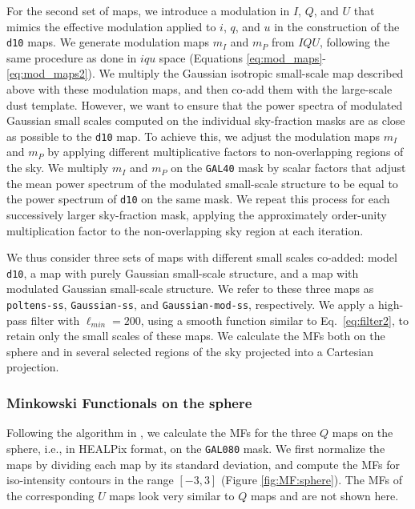 \documentclass[twocolumn]{aastex631}
\begin{document}
For the second set of maps, we introduce a modulation in $I$, $Q$, and $U$ that mimics the effective modulation applied to $i$, $q$, and $u$ in the construction of the \texttt{d10} maps. We generate modulation maps $m_I$ and $m_P$ from $IQU$, following the same procedure as done in $iqu$ space (Equations \ref{eq:mod_maps}-\ref{eq:mod_maps2}). We multiply the Gaussian isotropic small-scale map described above with these modulation maps, and then co-add them with the large-scale dust template. However, we want to ensure that the power spectra of modulated Gaussian small scales computed on the individual sky-fraction masks are as close as possible to the \texttt{d10} map. To achieve this, we adjust the modulation maps $m_I$ and $m_P$ by applying different multiplicative factors to non-overlapping regions of the sky. We multiply $m_I$ and $m_P$ on the \texttt{GAL40} mask by scalar factors that adjust the mean power spectrum of the modulated small-scale structure to be equal to the power spectrum of \texttt{d10} on the same mask. We repeat this process for each successively larger sky-fraction mask, applying the approximately order-unity multiplication factor to the non-overlapping sky region at each iteration. 

We thus consider three sets of maps with different small scales co-added: model \texttt{d10}, a map with purely Gaussian small-scale structure, and a map with modulated Gaussian small-scale structure. We refer to these three maps as \texttt{poltens-ss}, \texttt{Gaussian-ss}, and \texttt{Gaussian-mod-ss}, respectively. 
We apply a high-pass filter with $\ell_{min} = 200$, using a smooth function similar to Eq.~\ref{eq:filter2}, to retain only the small scales of these maps. We calculate the MFs both on the sphere and in several selected regions of the sky projected into a Cartesian projection. 

\subsubsection{Minkowski Functionals on the sphere}

Following the algorithm in \cite{Grewal:2022}, we calculate the MFs for the three $Q$ maps on the sphere, i.e., in HEALPix format, on the \texttt{GAL080} mask. We first normalize the maps by dividing each map by its standard deviation, and compute the MFs for iso-intensity contours in the range $[-3, 3]$ (Figure \ref{fig:MF:sphere}). The MFs of the corresponding $U$ maps look very similar to $Q$ maps and are not shown here.
\end{document}

